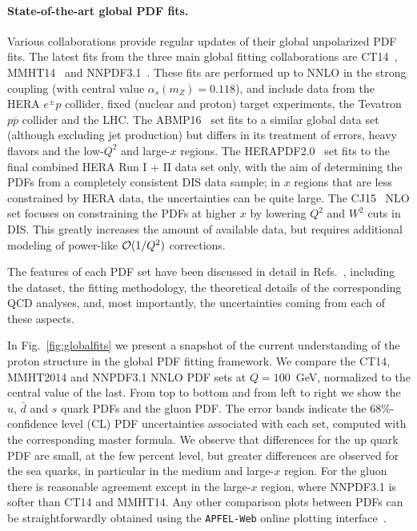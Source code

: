 \paragraph*{State-of-the-art global PDF fits.}
%
Various collaborations provide regular updates of their global unpolarized
PDF fits.
%
The latest fits from the three main global fitting collaborations
are CT14~\cite{Dulat:2015mca}, MMHT14~\cite{Harland-Lang:2014zoa} and
NNPDF3.1~\cite{Ball:2017nwa}.
%
These fits are performed up to NNLO in the strong coupling (with central value
$\alpha_s(m_Z)=0.118$), and include data from the HERA $e^{\pm} p$ collider, 
fixed (nuclear and proton) target experiments, the Tevatron $p\overline{p}$ 
collider and the LHC. 
%
The ABMP16~\cite{Alekhin:2017kpj} set fits to a similar global data set
(although excluding jet production) but differs in its treatment of errors,
 heavy flavors and the low-$Q^2$ and large-$x$ regions.
%
The HERAPDF2.0~\cite{Abramowicz:2015mha} set fits to the final combined HERA 
Run I + II data set only, with the aim of determining the PDFs from a 
completely consistent DIS data sample; in $x$ regions that are less constrained 
by HERA data, the uncertainties can be quite large.
%
The CJ15~\cite{Accardi:2016qay} NLO set focuses on constraining the PDFs at 
higher $x$ by lowering $Q^2$ and $W^2$ cuts in DIS.
%
This greatly increases the amount of available data, but requires additional 
modeling of power-like ${\cal O}(1/Q^2)$ corrections.

The features of each PDF set have been discussed in detail in 
Refs.~\cite{Butterworth:2015oua,Accardi:2016ndt}, including the 
dataset, the fitting methodology, the theoretical details of the 
corresponding QCD analyses, and, most importantly, the uncertainties
coming from each of these aspects.

In Fig.~\ref{fig:globalfits}
we present a snapshot of the current understanding
of the proton structure in the global PDF fitting framework.
%
We compare the CT14, MMHT2014
and NNPDF3.1 NNLO PDF sets at $Q=100$~GeV, normalized
to the central value of the last.
%
From top to bottom and from left to right we show the
$u$, $\bar{d}$ and $s$ quark PDFs and the gluon PDF.
%
The error bands indicate the 68\%-confidence level (CL) PDF uncertainties
associated with each set, computed with the corresponding master formula.
%
We observe that differences for the up quark PDF
are small, at the few percent level, but greater differences
are observed for the sea quarks, in particular
in the medium and large-$x$ region.
%
For the gluon there is reasonable agreement except in the large-$x$ region, 
where NNPDF3.1 is softer than CT14 and MMHT14.
%
Any other comparison plots between PDFs can be straightforwardly
obtained using the {\tt APFEL-Web} online plotting 
interface~\cite{Carrazza:2014gfa}.

